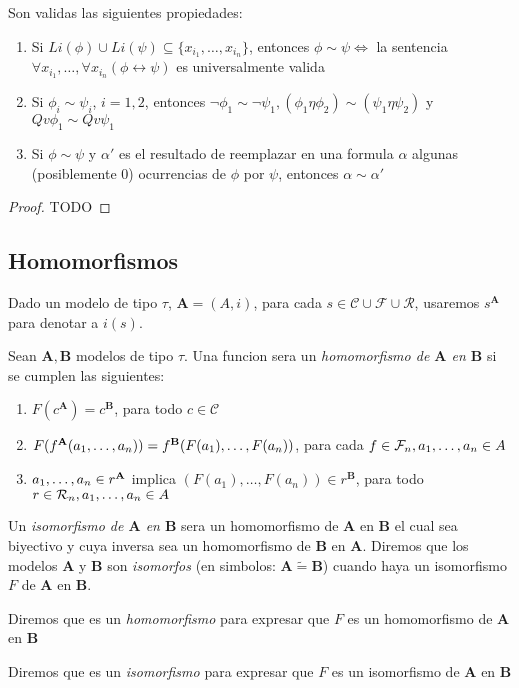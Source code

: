\begin{lemma}
  Son validas las siguientes propiedades:
  \begin{enumerate}
    \item Si $Li(\phi) \cup Li(\psi) \subseteq \{x_{i_1}, \dots, x_{i_n}\}$, entonces $\phi \sim \psi \iff$ la sentencia $\forall x_{i_1},\dots,\forall x_{i_n}(\phi \leftrightarrow \psi)$ es universalmente valida
    \item Si $\phi_i \sim \psi_i$, $i = 1, 2$, entonces $\neg\phi_1 \sim \neg\psi_1, (\phi_1\eta\phi_2)\sim(\psi_1\eta\psi_2)$ y $Qv\phi_1\sim Qv\psi_1$
    \item Si $\phi\sim\psi$ y $\alpha'$ es el resultado de reemplazar en una formula $\alpha$ algunas (posiblemente 0) ocurrencias de $\phi$ por $\psi$, entonces $\alpha \sim \alpha'$ 
  \end{enumerate}
\end{lemma}
\begin{proof}
  TODO
\end{proof}

\subsection{Homomorfismos}
\begin{definition}
  Dado un modelo de tipo $\tau$, $\mathbf{A} = (A, i)$, para cada $s\in\mathcal{C}\cup\mathcal{F}\cup\mathcal{R}$, usaremos $s^\mathbf{A}$
  para denotar a $i(s)$.
\end{definition}

\begin{definition}
  Sean $\mathbf{A}, \mathbf{B}$ modelos de tipo $\tau$. Una funcion  sera un \emph{homomorfismo de $\mathbf{A}$ en $\mathbf{B}$}
  si se cumplen las siguientes: \begin{enumerate}
    \item $F(c^\mathbf{A}) = c^\mathbf{B}$, para todo $c \in \mathcal{C}$
    \item $F(f^\mathbf{A}(a_{1}, \dots, a_{n})) = f^\mathbf{B}(F(a_1), \dots, F(a_n))$, para cada $f \in \mathcal{F}_n, a_{1}, \dots, a_{n} \in A$
    \item $a_{1}, \dots, a_{n} \in r^\mathbf{A}$ implica $(F(a_1), \dots, F(a_n)) \in r^\mathbf{B}$, para todo $r \in \mathcal{R}_n, a_{1}, \dots, a_{n}\in A$
  \end{enumerate}

  Un \emph{isomorfismo de $\mathbf{A}$ en $\mathbf{B}$} sera un homomorfismo de $\mathbf{A}$ en $\mathbf{B}$ el cual sea biyectivo y cuya inversa
  sea un homomorfismo de $\mathbf{B}$ en $\mathbf{A}$. Diremos que los modelos $\mathbf{A}$ y $\mathbf{B}$ son \emph{isomorfos} (en simbolos: $\mathbf{A} \tilde{=} \mathbf{B}$) 
  cuando haya un isomorfismo $F$ de $\mathbf{A}$ en $\mathbf{B}$.

  Diremos que  es un \emph{homomorfismo} para expresar que $F$ es un homomorfismo de $\mathbf{A}$ en $\mathbf{B}$

  Diremos que  es un \emph{isomorfismo} para expresar que $F$ es un isomorfismo de $\mathbf{A}$ en $\mathbf{B}$
\end{definition}

